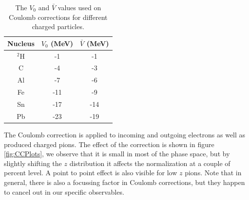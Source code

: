 \begin{table}[htbp]
  \centering
  \begin{tabular}{@{} ccc @{}}
    \hline 
Nucleus & $V_0$ (MeV)  &  $\bar V$ (MeV) \\ \hline
$^2$H & -1 &   -1 \\
C   &  -4 &    -3 \\
Al  &  -7 &    -6 \\
Fe  & -11 &    -9 \\
Sn  & -17 &   -14 \\
Pb  & -23 &   -19 \\
    \hline
  \end{tabular}
  \caption{The $V_0$ and $\bar V$ values used on Coulomb corrections for different charged particles.}
  \label{tab:Coulomb}
\end{table}

The Coulomb correction is applied to incoming and outgoing electrons as well as
produced charged pions. The effect of the correction is shown in figure \ref{fig:CCPlots},
we observe that it is small in most of the phase space, but by slightly shifting 
the $z$ distribution it affects the normalization at a couple of percent level. A
point to point effect is also visible for low $z$ pions. Note that in general, there
is also a focussing factor in Coulomb corrections, but they happen to cancel out in
our specific observables.

